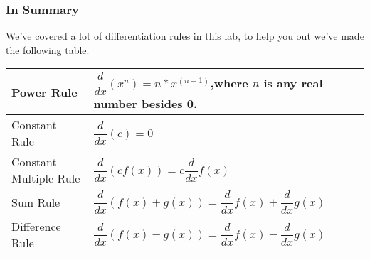 \documentclass{ximera}
\begin{document}
\subsubsection{In Summary}
We've covered a lot of differentiation rules in this lab, to help you out we've made the following table.
\begin{center}
{\renewcommand{\arraystretch}{3}
\begin{tabular}{| l | p{7.5cm} |}
    \hline
    Power Rule & $\displaystyle \dfrac{d}{dx}(x^n)=n*x^{(n-1)}$,where $n$ is any real number besides 0. \\
    \hline
    Constant Rule & $\displaystyle\dfrac{d}{dx}(c) = 0$ \\
    \hline
    Constant Multiple Rule & $\displaystyle\dfrac{d}{dx}(cf(x))=c\dfrac{d}{dx}f(x)$ \\
    \hline
    Sum Rule & $\displaystyle\dfrac{d}{dx}(f(x)+g(x))=\dfrac{d}{dx}f(x)+\dfrac{d}{dx}g(x)$ \\
    \hline
    Difference Rule & $\displaystyle\dfrac{d}{dx}(f(x)-g(x))=\dfrac{d}{dx}f(x)-\dfrac{d}{dx}g(x)$ \\
    \hline
\end{tabular}}
\end{center}
\pagebreak
\end{document}

